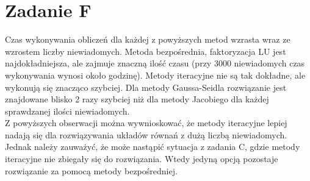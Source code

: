 \documentclass{article} %
\begin{document}
\section{Zadanie F}
Czas wykonywania obliczeń dla każdej z powyższych metod wzrasta wraz ze wzrostem liczby niewiadomych. Metoda bezpośrednia, faktoryzacja LU jest najdokładniejsza, ale zajmuje znaczną ilość czasu (przy 3000 niewiadomych czas wykonywania wynosi około godzinę). Metody iteracyjne nie są tak dokładne, ale wykonują się znacząco szybciej. Dla metody Gaussa-Seidla rozwiązanie jest znajdowane blisko 2 razy szybciej niż dla metody Jacobiego dla każdej sprawdzanej ilości niewiadomych. \\
Z powyższych obserwacji można wywnioskować, że metody iteracyjne lepiej nadają się dla rozwiązywania układów równań z dużą liczbą niewiadomych. Jednak należy zauważyć, że może nastąpić sytuacja z zadania C, gdzie metody iteracyjne nie zbiegały się do rozwiązania. Wtedy jedyną opcją pozostaje rozwiązanie za pomocą metody bezpośredniej.
\end{document}

